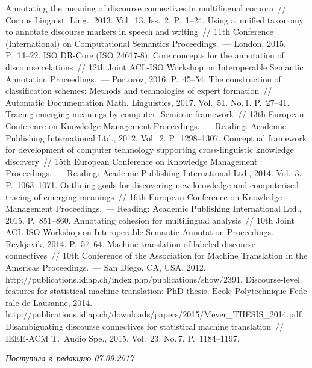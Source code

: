 \begin{multicols}{2}
{{\begin{thebibliography}{99}
   Annotating the meaning of discourse connectives in 
multilingual corpora~// Corpus Linguist. Ling., 2013. Vol.~13. Iss.~2. P.~1--24. 
   Using a~unified taxonomy to annotate discourse 
markers in speech and writing~// 11th Conference (International) on Computational 
Semantics Proceedings.~--- London, 2015. P.~14--22.
  ISO DR-Core (ISO 24617-8): Core concepts for the 
annotation of discourse relations~// 12th Joint ACL-ISO Workshop on Interoperable 
Semantic Annotation Proceedings.~--- Portoroz, 2016. P.~45--54.
   The construction of classification 
schemes: Methods and technologies of expert formation~// Automatic 
Documentation Math. Linguistics, 2017. Vol.~51. No.\,1. P.~27--41.
   Tracing emerging meanings by computer: Semiotic framework~// 
13th European Conference on Knowledge Management Proceedings.~--- Reading: 
Academic Publishing International Ltd., 2012. Vol.~2. P.~1298--1307.
Conceptual framework for development of computer technology supporting  
cross-linguistic knowledge discovery~// 15th European Conference on Knowledge 
Management Proceedings.~--- Reading: Academic Publishing International Ltd., 
2014. Vol.~3. P.~1063--1071.
   Outlining goals for discovering new knowledge and 
computerised tracing of emerging meanings~// 16th European Conference on 
Knowledge Management Proceedings.~--- Reading: Academic Publishing 
International Ltd., 2015. P.~851--860.
   Annotating cohesion for multilingual 
analysis~// 10th Joint ACL-ISO Workshop on Interoperable Semantic Annotation 
Proceedings.~--- Reykjavik, 2014. P.~57--64.
   Machine 
translation of labeled discourse connectives~// 10th Conference of the Association for 
Machine Translation in the Americas Proceedings.~--- San Diego, CA, 
USA, 2012. {\sf http://publications.idiap.ch/index.\linebreak php/publications/show/2391}.
   Discourse-level features for statistical machine translation: PhD 
thesis.  $\acute{\mbox{E}}$cole Polytechnique 
F$\acute{\mbox{e}}$d$\acute{\mbox{e}}$rale de Lausanne, 2014. {\sf 
http://publications.idiap.ch/\linebreak  downloads/papers/2015/Meyer\_THESIS\_2014.pdf}.
   Disambiguating discourse 
connectives for statistical machine translation~// IEEE-ACM T.~Audio 
Spe., 2015. Vol.~23. No.\,7. P.~1184--1197.
\end{thebibliography}
} }


\end{multicols}

 \label{end\stat}

 \vspace*{-12pt}

\hfill{\small\textit{Поступила в~редакцию  07.09.2017}}

\pagebreak
\renewcommand{\figurename}{\protect\bf Рис.}
\renewcommand{\tablename}{\protect\bf Таблица} 